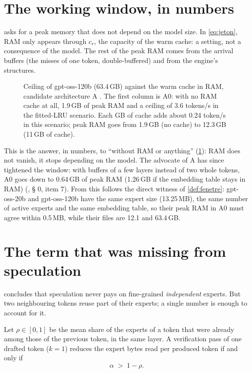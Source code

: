 \section{The working window, in numbers}\label{sec:fenetre-chiffree}

 asks for a peak memory that does not depend on the model size. In \cref{eq:jeton}, RAM only appears through $c_r$, the capacity of the warm cache: a setting, not a consequence of the model. The rest of the peak RAM comes from the arrival buffers (the misses of one token, double-buffered) and from the engine's structures.

\begin{figure}[ht]
\centering
\GraphePlafondRam
\caption[The working window: ceiling against RAM]{Ceiling of gpt-oss-120b (63.4\,GB) against the warm cache in RAM, candidate architecture A \calc. The first column is A0: with no RAM cache at all, 1.9\,GB of peak RAM and a ceiling of 3.6 tokens/s in the fitted-LRU scenario. Each GB of cache adds about 0.24 token/s in this scenario; peak RAM goes from 1.9\,GB (no cache) to 12.3\,GB (11\,GB of cache).}
\label{fig:plafond-ram}
\end{figure}

This is the answer, in numbers, to ``without RAM or anything'' (\cref{fig:plafond-ram}): RAM does not vanish, it stops depending on the model. The advocate of A has since tightened the window: with buffers of a few layers instead of two whole tokens, A0 goes down to 0.64\,GB of peak RAM (1.26\,GB if the embedding table stays in RAM) \calc{} (, § 0, item 7). From this follows the direct witness of \cref{def:fenetre}: gpt-oss-20b and gpt-oss-120b have the same expert size (13.25\,MB), the same number of active experts and the same embedding table, so their peak RAM in A0 must agree within 0.5\,MB, while their files are 12.1 and 63.4\,GB.

\section{The term that was missing from speculation}\label{sec:spec-rho}

 concludes that speculation never pays on fine-grained \emph{independent} experts. But two neighbouring tokens reuse part of their experts; a single number is enough to account for it.

\begin{proposition}\label{prop:spec-rho}
Let $\rho \in [0, 1]$ be the mean share of the experts of a token that were already among those of the previous token, in the same layer. A verification pass of one drafted token ($k = 1$) reduces the expert bytes read per produced token if and only if
\begin{equation}\label{eq:spec-rho}
\alpha \;>\; 1 - \rho .
\end{equation}
\end{proposition}

